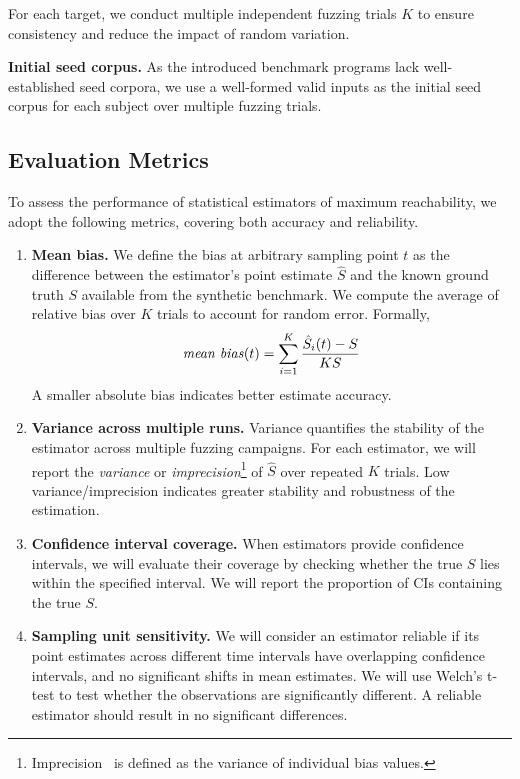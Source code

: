\documentclass[conference,anonymous,review]{IEEEtran}
\begin{document}
For each target, we conduct multiple independent fuzzing trials $K$ to ensure consistency and reduce the impact of random variation.

\noindent\textbf{Initial seed corpus.} As the introduced benchmark programs lack well-established seed corpora, we use a well-formed valid inputs as the initial seed corpus for each subject over multiple fuzzing trials.

\subsection{Evaluation Metrics}
To assess the performance of statistical estimators of maximum reachability, we adopt
the following metrics, covering both accuracy and reliability.

\begin{enumerate}
\item \textbf{Mean bias.} We define the bias at arbitrary sampling point $t$ as the difference between the estimator's
point estimate $\hat{S}$ and the known ground truth $S$ available from the synthetic benchmark. We compute the average of relative bias over $K$ trials to account for random error.
Formally,
\begin{equation}
\text{\emph{mean bias}}(t) = \sum_{i=1}^K \frac{\hat{S}_i(t)-S}{KS}
\end{equation}
A smaller absolute bias indicates better estimate accuracy. %
\item \textbf{Variance across multiple runs.} Variance quantifies the stability of the
estimator across multiple fuzzing campaigns. For each estimator, we will report the \emph{variance} or \emph{imprecision}\footnote{Imprecision~\cite{liyanage2023reachable} is defined as the variance of individual bias values.}
of $\hat{S}$ over repeated $K$ trials. Low variance/imprecision indicates greater stability and robustness of the estimation.
\item \textbf{Confidence interval coverage.} When estimators provide confidence intervals, we will evaluate their coverage by checking whether the true $S$ lies within the specified interval. We will report the proportion of CIs containing the true $S$.
\item\textbf{Sampling unit sensitivity.} We will consider an estimator reliable if its
point estimates across different time intervals have overlapping confidence intervals, and
no significant shifts in mean estimates. We will use Welch's t-test to test whether the 
observations are significantly different. A reliable estimator should result in no significant
differences.
\end{enumerate}
\end{document}
